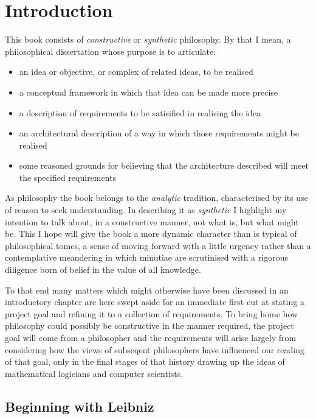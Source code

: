 
\chapter{Introduction}\label{IntroductionA}

This book consists of {\it constructive} or {\it synthetic} philosophy.
By that I mean, a philosophical dissertation whose purpose is to articulate:

\begin{itemize}
\item an idea or objective, or complex of related ideas, to be realised
\item a conceptual framework in which that idea can be made more precise
\item a description of requirements to be satisified in realising the idea
\item an architectural description of a way in which those requirements might be realised
\item some reasoned grounds for believing that the architecture described will meet the specified requirements
\end{itemize}

As philosophy the book belongs to the {\it analytic} tradition, characterised by its use of reason to seek understanding.
In describing it as {\it synthetic} I highlight my intention to talk about, in a constructive manner, not what is, but what might be.
This I hope will give the book a more dynamic character than is typical of philosophical tomes, a sense of moving forward with a little urgency rather than a contemplative meandering in which minutiae are scrutinised with a rigorous diligence born of belief in the value of all knowledge.

To that end many matters which might otherwise have been discussed in an introductory chapter are here swept aside for an immediate first cut at stating a project goal and refining it to a collection of requirements.
To bring home how philosophy could possibly be constructive in the manner required, the project goal will come from a philosopher and the requirements will arise largely from considering how the views of subseqent philosophers have influenced our reading of that goal, only in the final stages of that history drawing up the ideas of mathematical logicians and computer scientists.

\section{Beginning with Leibniz}

